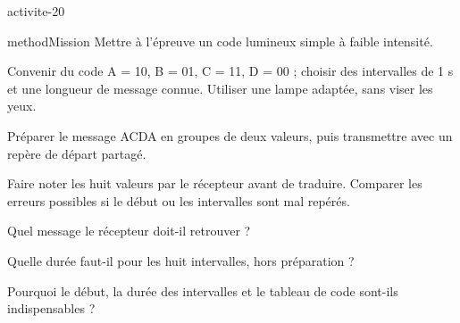 \documentclass[12pt,twoside,openany]{book}
\begin{document}
\label{ch-20-activite}
\begin{pcFiche}{activite-20}
\begin{pcEncadre}{method}{Mission}
Mettre à l’épreuve un code lumineux simple à faible intensité.\par
\end{pcEncadre}
\begin{questions}
\item Convenir du code A = 10, B = 01, C = 11, D = 00 ; choisir des intervalles de 1 s et une longueur de message connue. Utiliser une lampe adaptée, sans viser les yeux.
\item Préparer le message ACDA en groupes de deux valeurs, puis transmettre avec un repère de départ partagé.
\item Faire noter les huit valeurs par le récepteur avant de traduire. Comparer les erreurs possibles si le début ou les intervalles sont mal repérés.
\end{questions}
\begin{questions}
\item Quel message le récepteur doit-il retrouver ?
\item Quelle durée faut-il pour les huit intervalles, hors préparation ?
\item Pourquoi le début, la durée des intervalles et le tableau de code sont-ils indispensables ?
\end{questions}
\end{pcFiche}
\label{ch-20-bilan}
\end{document}
